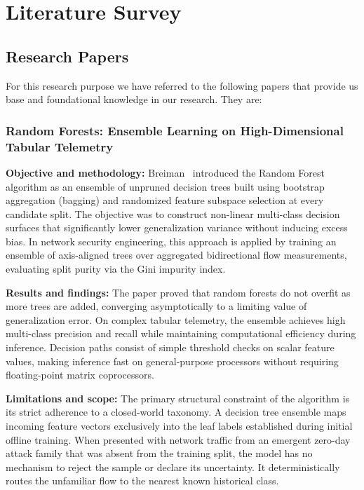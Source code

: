 \chapter{Literature Survey}
\label{chap:literature_review}
\label{chap:lit_survey}

\section{Research Papers}
\label{sec:research_papers}

For this research purpose we have referred to the following papers that provide us base and foundational knowledge in our research. They are:

\subsection{Random Forests: Ensemble Learning on High-Dimensional Tabular Telemetry}

\noindent\textbf{Objective and methodology:} Breiman~\cite{breiman2001random} introduced the Random Forest algorithm as an ensemble of unpruned decision trees built using bootstrap aggregation (bagging) and randomized feature subspace selection at every candidate split. The objective was to construct non-linear multi-class decision surfaces that significantly lower generalization variance without inducing excess bias. In network security engineering, this approach is applied by training an ensemble of axis-aligned trees over aggregated bidirectional flow measurements, evaluating split purity via the Gini impurity index.

\smallskip
\noindent\textbf{Results and findings:} The paper proved that random forests do not overfit as more trees are added, converging asymptotically to a limiting value of generalization error. On complex tabular telemetry, the ensemble achieves high multi-class precision and recall while maintaining computational efficiency during inference. Decision paths consist of simple threshold checks on scalar feature values, making inference fast on general-purpose processors without requiring floating-point matrix coprocessors.

\smallskip
\noindent\textbf{Limitations and scope:} The primary structural constraint of the algorithm is its strict adherence to a closed-world taxonomy. A decision tree ensemble maps incoming feature vectors exclusively into the leaf labels established during initial offline training. When presented with network traffic from an emergent zero-day attack family that was absent from the training split, the model has no mechanism to reject the sample or declare its uncertainty. It deterministically routes the unfamiliar flow to the nearest known historical class.

